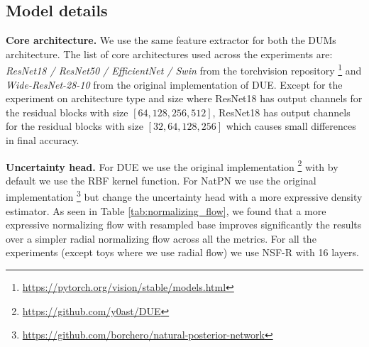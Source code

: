 \subsection{Model details} 

\textbf{Core architecture.} We use the same feature extractor for both the DUMs architecture. The list of core architectures used across the experiments are: \textit{ResNet18 / ResNet50 / EfficientNet / Swin} \citep{he2016resnet, tan2021effcientnet, liu2021swin} from the torchvision repository \footnote{\url{https://pytorch.org/vision/stable/models.html}} and \textit{Wide-ResNet-28-10} \citep{zagoruyko2016wide} from the original implementation of DUE. Except for the experiment on architecture type and size where ResNet18 has output channels for the residual blocks with size $[64,128,256,512]$,  ResNet18 has output channels for the residual blocks with size $[32, 64, 128, 256]$ which causes small differences in final accuracy.

\textbf{Uncertainty head.} For DUE we use the original implementation \footnote{\url{https://github.com/y0ast/DUE}} with by default we use the RBF kernel function. For NatPN we use the original implementation \footnote{\url{https://github.com/borchero/natural-posterior-network}} but change the uncertainty head with a more expressive density estimator. As seen in Table \ref{tab:normalizing_flow}, we found that a more expressive normalizing flow with resampled base \citep{durkan2019nsf, stimper2022resampled-nf} improves significantly the results over a simpler radial normalizing flow \citep{rezende2015nf} across all the metrics. For all the experiments (except toys where we use radial flow) we use NSF-R with 16 layers.

